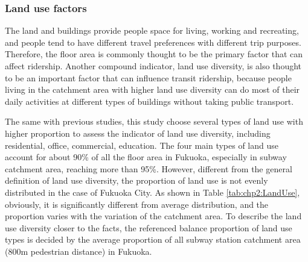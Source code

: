 %
\subsubsection{Land use factors}
%
The land and buildings provide people space for living, working and recreating, and people tend to have different travel preferences with different trip purposes. Therefore, the floor area is commonly thought to be the primary factor that can affect ridership. Another compound indicator, land use diversity, is also thought to be an important factor that can influence transit ridership, because people living in the catchment area with higher land use diversity can do most of their daily activities at different types of buildings without taking public transport.

%
The same with previous studies, this study choose several types of land use with higher proportion to assess the indicator of land use diversity, including residential, office, commercial, education. The four main types of land use account for about 90\% of all the floor area in Fukuoka, especially in subway catchment area, reaching more than 95\%. However, different from the general definition of land use diversity, the proportion of land use is not evenly distributed in the case of Fukuoka City. As shown in Table \ref{tab:chp2:LandUse}, obviously, it is significantly different from average distribution, and the proportion varies with the variation of the catchment area. To describe the land use diversity closer to the facts, the referenced balance proportion of land use types is decided by the average proportion of all subway station catchment area (800m pedestrian distance) in Fukuoka.

